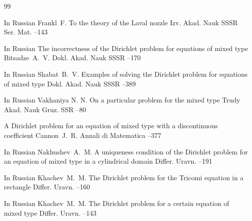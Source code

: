 \makeentitle

\vspace{-5mm}







\begin{thebibliography}{99}

\lang In Russian
\by Frankl~F.
\paper To the theory of the Laval nozzle
\jour Izv. Akad. Nauk SSSR Ser. Mat.
--143



\lang In Russian
\paper The incorrectness of the Dirichlet problem for equations of mixed type
\by Bitsadze~A.~V.
\jour  Dokl. Akad. Nauk SSSR
--170

\newpage

\lang In Russian
\by Shabat~B.~V.
\paper Examples of solving the Dirichlet problem for equations of mixed type
\jour  Dokl. Akad. Nauk SSSR
--389

\lang In Russian
\by Vakhaniya N. N. 
\paper On a particular problem for the mixed type
\jour Trudy Akad. Nauk Gruz. SSR
--80

\paper A Dirichlet problem for an equation of mixed type with a discontinuous coefficient
\by Cannon~J.~R.
\jour Annali di Matematica 
--377

\lang In Russian
\by Nakhushev~A.~M.
\paper A uniqueness condition of the Dirichlet problem for an equation of mixed type in a cylindrical domain
\jour Differ. Uravn.
--191


\lang In Russian
\by Khachev~M.~M.
\paper The Dirichlet problem for the Tricomi equation in a rectangle
\jour Differ. Uravn.
--160


\lang In Russian
\by Khachev~M.~M.
\paper The Dirichlet problem for a certain equation of mixed type
\jour Differ. Uravn.
--143


\end{thebibliography}
